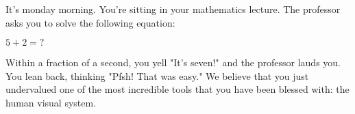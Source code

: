 
	It's monday morning. You're sitting in your mathematics lecture. The professor asks you to solve the following equation:
	
	\begin{center}
		$5 + 2 = ?$
	\end{center}
	
	Within a fraction of a second, you yell "It's seven!" and the professor lauds you. You lean back, thinking "Pfsh! That was easy."  We believe that you just undervalued one of the most incredible tools that you have been blessed with: the human visual system.

